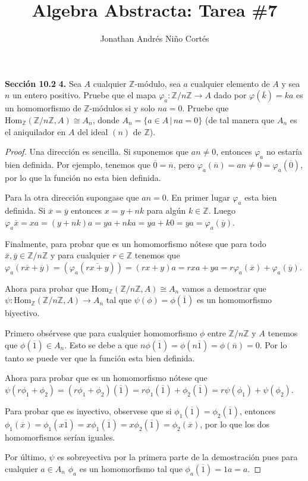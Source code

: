 \documentclass[letter,twoside,12pt]{article}
\title{Algebra Abstracta: Tarea \#7}
\author{Jonathan Andrés Niño Cortés}
\begin{document}
\maketitle
\textbf{Sección 10.2} \textbf{4.} Sea $ A $ cualquier $ \mathbb{Z} $-módulo, sea $ a $ cualquier elemento de $ A $ y sea $ n $ un entero positivo. Pruebe que el mapa $ \varphi_a: \mathbb{Z}/n\mathbb{Z} \to A $ dado por $ \varphi(\overline{k}) = ka $ es un homomorfismo de $ \mathbb{Z} $-módulos si y solo $ na = 0 $. Pruebe que $ \text{Hom}_\mathbb{Z}(\mathbb{Z}/n\mathbb{Z}, A) \cong A_n $, donde $ A_n = \{ a \in A \,|\, na = 0\}$ (de tal manera que $ A_n $ es el aniquilador en $ A $ del ideal $ (n) $ de $ \mathbb{Z} $).

\begin{proof}
Una dirección es sencilla. Si suponemos que $ an \not = 0 $, entonces $ \varphi_a $ no estaría bien definida. Por ejemplo, tenemos que $ \overline{0} = \overline{n} $, pero $ \varphi_a(\overline{n})= an \not = 0 = \varphi_a(\overline{0}) $, por lo que la función no esta bien definida.

Para la otra dirección supongase que $ an = 0 $. En primer lugar $ \varphi_a $ esta bien definida. Si $ \overline{x} = \overline{y} $ entonces $ x = y+nk $ para algún $ k \in \mathbb{Z} $. Luego $ \varphi_a{\overline{x}}=xa = (y+nk)a = ya +nka = ya +k0 = ya = \varphi_a(\overline{y}) $.

Finalmente, para probar que es un homomorfismo nótese que para todo $ \overline{x}, \overline{y} \in \mathbb{Z}/n\mathbb{Z} $ y para cualquier $ r \in  \mathbb{Z}$ tenemos que $ \varphi_a(r\overline{x}+\overline{y}) = (\varphi_a(\overline{rx+y})) = (rx+y)a = rxa + ya = r\varphi_a(\overline{x})+\varphi_a(\overline{y})$.

Ahora para probar que $ \text{Hom}_\mathbb{Z}(\mathbb{Z}/n\mathbb{Z},A) \cong A_n $ vamos a demostrar que $ \psi: \text{Hom}_\mathbb{Z}(\mathbb{Z}/n\mathbb{Z},A) \to A_n  $ tal que $ \psi(\phi) = \phi(\overline{1}) $ es un homomorfismo biyectivo.

Primero obsérvese que para cualquier homomorfismo $ \phi $ entre $ \mathbb{Z}/n\mathbb{Z} $ y $ A $ tenemos que $ \phi(\overline{1}) \in A_n $. Esto se debe a que $ n\phi(\overline{1})=\phi(n\overline{1})=\phi(\overline{n})=0 $. Por lo tanto se puede ver que la función esta bien definida.

Ahora para probar que es un homomorfismo nótese que $ \psi(r\phi_1+\phi_2)= (r\phi_1+\phi_2)(\overline{1})=r\phi_1(\overline{1})+\phi_2(\overline{1}) = r \psi(\phi_1)+\psi(\phi_2)$.

Para probar que es inyectivo, observese que si $ \phi_1(\overline{1}) = \phi_2(\overline{1}) $, entonces $ \phi_1(\overline{x})=\phi_1(x\overline{1})=x\phi_1(\overline{1})=x\phi_2(\overline{1})=\phi_2(\overline{x}) $, por lo que los dos homomorfismos serían iguales.

Por último, $ \psi $ es sobreyectiva por la primera parte de la demostración pues para cualquier $ a \in A_n $ $ \phi_a $ es un homomorfismo tal que $ \phi_a(\overline{1})=1a = a $.

\end{proof}
\end{document}
